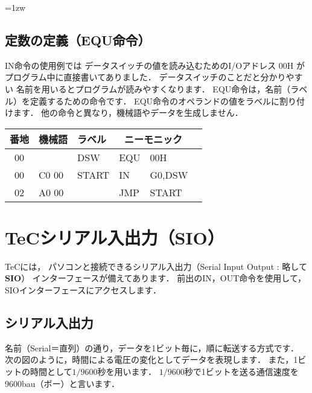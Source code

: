 \begin{framed}{\parindent=1zw
\subsection*{定数の定義（EQU命令）}
{\small IN命令の使用例では
データスイッチの値を読み込むためのI/Oアドレス 00H が
プログラム中に直接書いてありました．
データスイッチのことだと分かりやすい
名前を用いるとプログラムが読みやすくなります．
EQU命令は，名前（ラベル）を定義するための命令です．
EQU命令のオペランドの値をラベルに割り付けます．
他の命令と異なり，機械語やデータを生成しません．

{\tt\small\begin{center}
\begin{tabular}{|c|l|l|l l|l}
\hline
番地 & 機械語 & ラベル & \multicolumn{2}{|c|}{ニーモニック} \\
\hline
00 &       & DSW   & EQU  & 00H     \\
00 & C0 00 & START & IN   & G0,DSW  \\
02 & A0 00 &       & JMP  & START   \\ 
\hline
\end{tabular}
\end{center}}}
}\end{framed}

\newpage
\section{TeCシリアル入出力（SIO）}
\label{sio}
TeCには，
パソコンと接続できるシリアル入出力（Serial Input Output : 略して {\bf SIO}）
インターフェースが備えてあります．
前出のIN，OUT命令を使用して，
SIOインターフェースにアクセスします．

\subsection{シリアル入出力}
名前（Serial＝直列）の通り，データを1ビット毎に，順に転送する方式です．
次の図のように，時間による電圧の変化としてデータを表現します．
また，1ビットの時間として$1/9600$秒を用います．
$1/9600$秒で1ビットを送る通信速度を9600bau（ボー）と言います．


